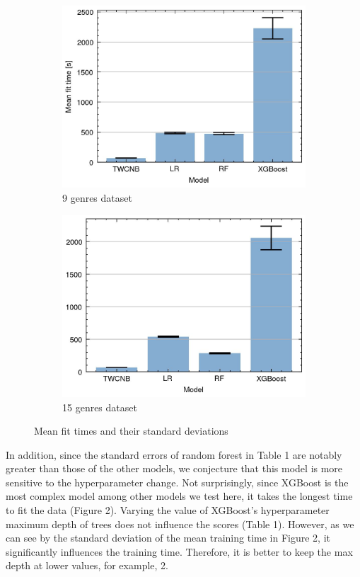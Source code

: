 \documentclass{article}
\begin{document}
\begin{figure}[h]
\begin{subfigure}{.5\textwidth}
  \centering
  \includegraphics[width=.9\linewidth]{../../gfx/redgenrestimes.jpg}
  \caption{9 genres dataset}
  \label{fig:sub1}
\end{subfigure}%
\begin{subfigure}{.5\textwidth}
  \centering
  \includegraphics[width=.9\linewidth]{../../gfx/allgenrestimes.jpg}
  \caption{15 genres dataset}
  \label{fig:figure2}
\end{subfigure}
\caption{Mean fit times and their standard deviations}
\label{fig:test}
\end{figure}
\par In addition, since the standard errors of random forest in Table 1 are notably greater than those of the other models, we conjecture that this model is more sensitive to the hyperparameter change. Not surprisingly, since XGBoost is the most complex model among other models we test here, it takes the longest time to fit the data (Figure 2). Varying the value of XGBoost's hyperparameter maximum depth of trees does not influence the scores (Table 1). However, as we can see by the standard deviation of the mean training time in Figure 2, it significantly influences the training time. Therefore, it is better to keep the max depth at lower values, for example, 2. 
\end{document}
